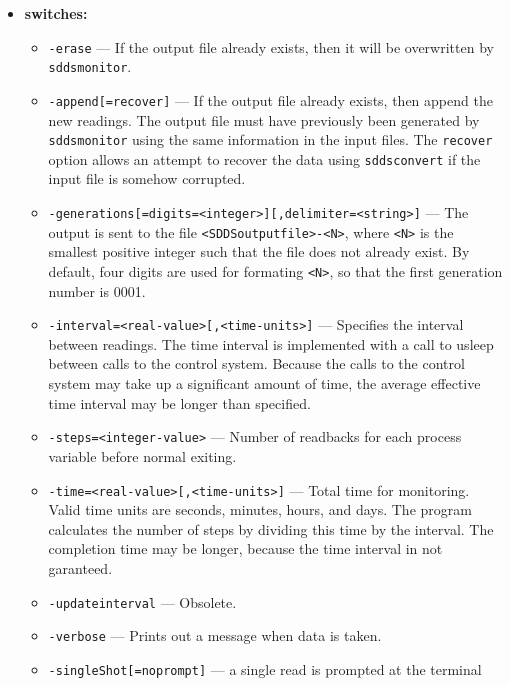 \begin{itemize}
%
\item {\bf switches:}
%
%
    \begin{itemize}
%
%
        \item {\tt -erase} --- If the output file already exists, then it will be overwritten
                by \verb+sddsmonitor+.
        \item {\tt -append[=recover]} --- If the output file already exists, then append the new readings.
                The output file must have previously been generated by \verb+sddsmonitor+ using the same
                information in the input files. The {\verb+recover+} option allows an attempt
                to recover the data using \verb+sddsconvert+ if the input file is somehow corrupted.
        \item {\verb+-generations[=digits=<integer>][,delimiter=<string>]+} ---
                The output is sent to the file \verb+<SDDSoutputfile>-<N>+, where \verb+<N>+ is
                   the smallest positive integer such that the file does not already
                   exist.   By default, four digits are used for formating \verb+<N>+, so that
                   the first generation number is 0001.
        \item {\tt -interval=<real-value>[,<time-units>]} --- Specifies the interval between readings. The time
                interval is implemented with a call to usleep between calls to the control system.
                Because the calls to the control system may take up a significant amount of time, the average
                effective time interval may be longer than specified. 
        \item {\tt -steps=<integer-value>} --- Number of readbacks for each process variable before normal exiting.
        \item {\tt -time=<real-value>[,<time-units>]} --- Total time for monitoring. Valid time units are
                seconds, minutes, hours, and days. The program calculates the number of steps by dividing this time
                by the interval. The completion time may be longer, because the time interval in not garanteed.
        \item {\tt -updateinterval} --- Obsolete.
        \item {\tt -verbose} --- Prints out a message when data is taken.
        \item {\verb+-singleShot[=noprompt]+} --- a single read is prompted at the terminal

\end{itemize}
\end{itemize}
